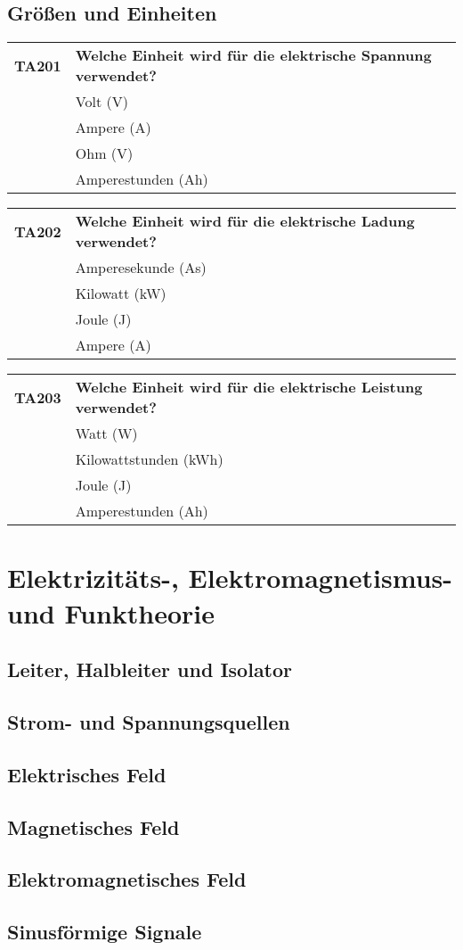\documentclass[
  ngerman,
  paper=a4,
  10pt,
  headings=small,
  DIV=15,
]{scrartcl}
\makeatletter
\newenvironment{question}[2]{
  \noindent
  \setcounter{answer}{1}
  \begin{tabular}{@{}cp{6.5cm}@{}}
  \textbf{#1} & \textbf{#2}\\
}{
  \end{tabular}
  \bigskip
}
\newcounter{answer}
\newcommand{\answer}[1]{
  \textbf{\Alph{answer}}
  \stepcounter{answer}
  & #1\\}
\makeatother
\begin{document}
  \subsection{Größen und Einheiten}
  
  \begin{question}{TA201}{Welche Einheit wird für die elektrische Spannung verwendet?}
    \answer{Volt (V)}
    \answer{Ampere (A)}
    \answer{Ohm (V)}
    \answer{Amperestunden (Ah)}  
  \end{question}
  
  \begin{question}{TA202}{Welche Einheit wird für die elektrische Ladung verwendet?}
    \answer{Amperesekunde (As)}
    \answer{Kilowatt (kW)}
    \answer{Joule (J)}
    \answer{Ampere (A)}  
  \end{question}
  
  \begin{question}{TA203}{Welche Einheit wird für die elektrische Leistung verwendet?}
    \answer{Watt (W)}
    \answer{Kilowattstunden (kWh)}
    \answer{Joule (J)}
    \answer{Amperestunden (Ah)}
  \end{question}
  
  \section{Elektrizitäts-, Elektromagnetismus- und Funktheorie}
  
  \subsection{Leiter, Halbleiter und Isolator}
  \subsection{Strom- und Spannungsquellen}
  \subsection{Elektrisches Feld}
  \subsection{Magnetisches Feld}
  \subsection{Elektromagnetisches Feld}
  \subsection{Sinusförmige Signale}
\end{document}
